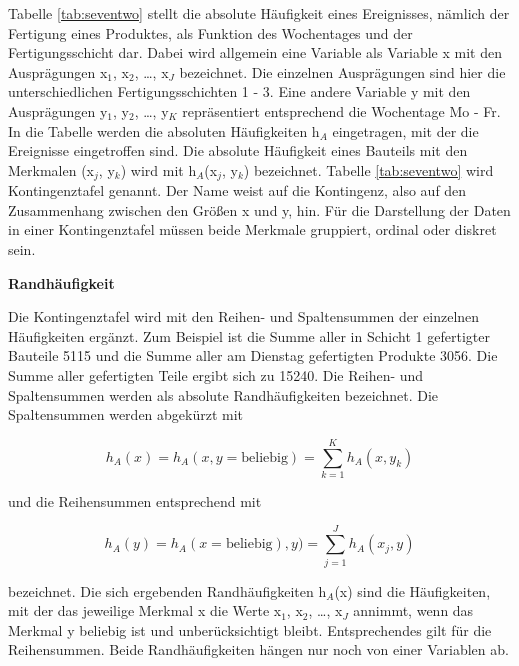 \noindent Tabelle \ref{tab:seventwo} stellt die absolute H\"{a}ufigkeit eines Ereignisses, n\"{a}mlich der Fertigung eines Produktes, als Funktion des Wochentages und der Fertigungsschicht dar. Dabei wird allgemein eine Variable als Variable x mit den Auspr\"{a}gungen x$_{1}$, x$_{2}$, {\dots}, x$_{J}$ bezeichnet. Die einzelnen Auspr\"{a}gungen sind hier die unterschiedlichen Fertigungsschichten 1 - 3. Eine andere Variable y mit den Auspr\"{a}gungen y$_{1}$, y$_{2}$, {\dots}, y$_{K}$ repr\"{a}sentiert entsprechend die Wochentage Mo - Fr. In die Tabelle werden die absoluten H\"{a}ufigkeiten h$_{A}$ eingetragen, mit der die Ereignisse eingetroffen sind. Die absolute H\"{a}ufigkeit eines Bauteils mit den Merkmalen (x$_{j}$, y$_{k}$) wird mit h$_{A}$(x$_{j}$, y$_{k}$) bezeichnet. Tabelle \ref{tab:seventwo} wird Kontingenztafel genannt. Der Name weist auf die Kontingenz, also auf den Zusammenhang zwischen den Gr\"{o}{\ss}en x und y, hin. F\"{u}r die Darstellung der Daten in einer Kontingenztafel m\"{u}ssen beide Merkmale gruppiert, ordinal oder diskret sein.\bigskip

{\selectfont
\noindent\textbf{Randh\"{a}ufigkeit}}\smallskip

\noindent Die Kontingenztafel wird mit den Reihen- und Spaltensummen der einzelnen H\"{a}ufigkeiten erg\"{a}nzt. Zum Beispiel ist die Summe aller in Schicht 1 gefertigter Bauteile 5115 und die Summe aller am Dienstag gefertigten Produkte 3056. Die Summe aller gefertigten Teile ergibt sich zu 15240. Die Reihen- und Spaltensummen werden als absolute Randh\"{a}ufigkeiten bezeichnet. Die Spaltensummen werden abgek\"{u}rzt mit 

\begin{equation}\label{eq:sevenone}
h_{A}(x)=h_{A}(x,y=\text{beliebig})=\sum _{k=1}^{K}h_{A} (x,y_{k})
\end{equation}

\noindent und die Reihensummen entsprechend mit 

\begin{equation}\label{eq:seventwo}
h_{A}(y)=h_{A}(x=\text{beliebig}),y)=\sum _{j=1}^{J}h_{A}(x_{j} ,y)
\end{equation}

\noindent bezeichnet. Die sich ergebenden Randh\"{a}ufigkeiten h$_{A}$(x) sind die H\"{a}ufigkeiten, mit der das jeweilige Merkmal x die Werte x$_{1}$, x$_{2}$, {\dots}, x$_{J}$ annimmt, wenn das Merkmal y beliebig ist und unber\"{u}cksichtigt bleibt. Entsprechendes gilt f\"{u}r die Reihensummen. Beide Randh\"{a}ufigkeiten h\"{a}ngen nur noch von einer Variablen ab.\newline


